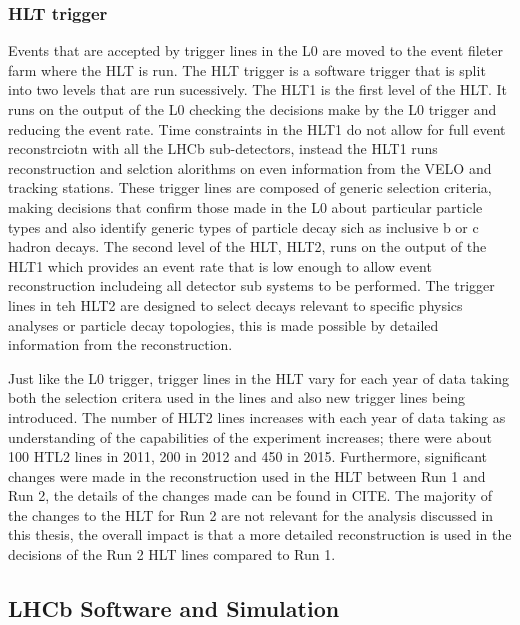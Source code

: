 \subsubsection{HLT trigger}
Events that are accepted by trigger lines in the L0 are moved to the event fileter farm where the HLT is run. The HLT trigger is a software trigger that is split into two levels that are run sucessively. The HLT1 is the first level of the HLT. It runs on the output of the L0 checking the decisions make by the L0 trigger and reducing the event rate.%
Time constraints in the HLT1 do not allow for full event reconstrciotn with all the LHCb sub-detectors, instead the HLT1 runs reconstruction and selction alorithms on even information from the VELO and tracking stations. These trigger lines are composed of generic selection criteria, making decisions that confirm those made in the L0 about particular particle types and also identify generic types of particle decay sich as inclusive b or c hadron decays. The second level of the HLT, HLT2, runs on the output of the HLT1 which provides an event rate that is low enough to allow event reconstruction includeing all detector sub systems to be performed. The trigger lines in teh HLT2 are designed to select decays relevant to specific physics analyses or particle decay topologies, this is made possible by detailed information from the reconstruction. 

Just like the L0 trigger, trigger lines in the HLT vary for each year of data taking both the selection critera used in the lines and also new trigger lines being introduced. The number of HLT2 lines increases with each year of data taking as understanding of the capabilities of the experiment increases; there were about 100 HTL2 lines in 2011, 200 in 2012 and 450 in 2015. Furthermore, significant changes were made in the reconstruction used in the HLT between Run 1 and Run 2,  the details of the changes made can be found in CITE. The majority of the changes to the HLT for Run 2 are not relevant for the analysis discussed in this thesis, the overall impact is that a more detailed reconstruction is used in the decisions of the Run 2 HLT lines compared to Run 1.



\subsection{LHCb Software and Simulation}



